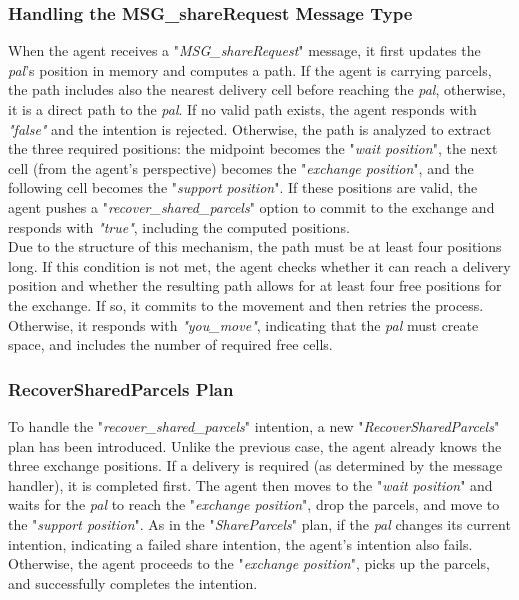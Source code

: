         
        \subsubsection{Handling the MSG\_shareRequest Message Type}
            When the agent receives a "\textit{MSG\_shareRequest}" message, it first updates the \textit{pal}'s position in memory and computes a path. If the agent is carrying parcels, the path includes also the nearest delivery cell before reaching the \textit{pal}, otherwise, it is a direct path to the \textit{pal}. If no valid path exists, the agent responds with \textit{"false"} and the intention is rejected. Otherwise, the path is analyzed to extract the three required positions: the midpoint becomes the "\textit{wait position}", the next cell (from the agent's perspective) becomes the "\textit{exchange position}", and the following cell becomes the "\textit{support position}". If these positions are valid, the agent pushes a "\textit{recover\_shared\_parcels}" option to commit to the exchange and responds with \textit{"true"}, including the computed positions.
            \medskip\\
            Due to the structure of this mechanism, the path must be at least four positions long. If this condition is not met, the agent checks whether it can reach a delivery position and whether the resulting path allows for at least four free positions for the exchange. If so, it commits to the movement and then retries the process. Otherwise, it responds with \textit{"you\_move"}, indicating that the \textit{pal} must create space, and includes the number of required free cells.
            
        \subsubsection{RecoverSharedParcels Plan}
            To handle the "\textit{recover\_shared\_parcels}" intention, a new "\textit{RecoverSharedParcels}" plan has been introduced. Unlike the previous case, the agent already knows the three exchange positions. If a delivery is required (as determined by the message handler), it is completed first. The agent then moves to the "\textit{wait position}" and waits for the \textit{pal} to reach the "\textit{exchange position}", drop the parcels, and move to the "\textit{support position}". As in the "\textit{ShareParcels}" plan, if the \textit{pal} changes its current intention, indicating a failed share intention, the agent's intention also fails. Otherwise, the agent proceeds to the "\textit{exchange position}", picks up the parcels, and successfully completes the intention.